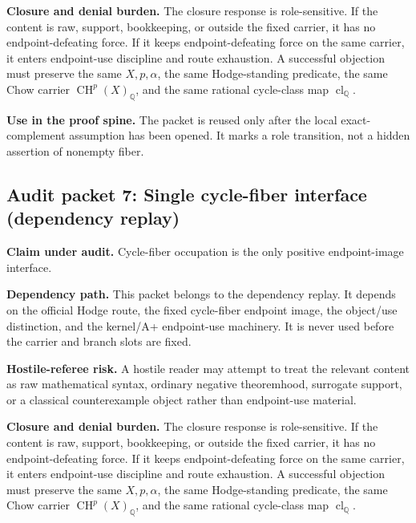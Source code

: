 \documentclass[11pt]{article}
\newcommand{\QQ}{\mathbb{Q}}
\newcommand{\CH}{\operatorname{CH}}
\newcommand{\clQ}{\operatorname{cl}_{\QQ}}
\begin{document}
\par\noindent\textbf{Closure and denial burden.} The closure response is role-sensitive. If the content is raw, support, bookkeeping, or outside the fixed carrier, it has no endpoint-defeating force. If it keeps endpoint-defeating force on the same carrier, it enters endpoint-use discipline and route exhaustion. A successful objection must preserve the same $X,p,\alpha$, the same Hodge-standing predicate, the same Chow carrier $\CH^p(X)_\QQ$, and the same rational cycle-class map $\clQ$.


\par\noindent\textbf{Use in the proof spine.} The packet is reused only after the local exact-complement assumption has been opened. It marks a role transition, not a hidden assertion of nonempty fiber.


\subsection{Audit packet 7: Single cycle-fiber interface (dependency replay)}


\par\noindent\textbf{Claim under audit.} Cycle-fiber occupation is the only positive endpoint-image interface.


\par\noindent\textbf{Dependency path.} This packet belongs to the dependency replay. It depends on the official Hodge route, the fixed cycle-fiber endpoint image, the object/use distinction, and the kernel/A+ endpoint-use machinery. It is never used before the carrier and branch slots are fixed.


\par\noindent\textbf{Hostile-referee risk.} A hostile reader may attempt to treat the relevant content as raw mathematical syntax, ordinary negative theoremhood, surrogate support, or a classical counterexample object rather than endpoint-use material.


\par\noindent\textbf{Closure and denial burden.} The closure response is role-sensitive. If the content is raw, support, bookkeeping, or outside the fixed carrier, it has no endpoint-defeating force. If it keeps endpoint-defeating force on the same carrier, it enters endpoint-use discipline and route exhaustion. A successful objection must preserve the same $X,p,\alpha$, the same Hodge-standing predicate, the same Chow carrier $\CH^p(X)_\QQ$, and the same rational cycle-class map $\clQ$.
\end{document}
